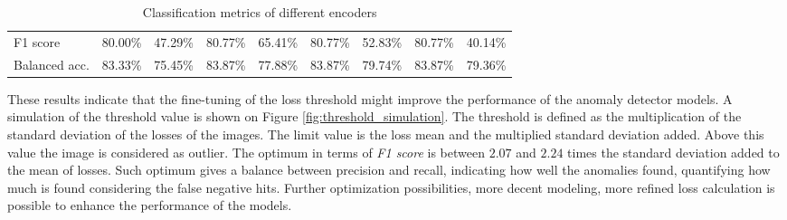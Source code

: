 \begin{table}[H]
\begin{tabular}{l | c c | c c | c c | c c}
        \hline
        F1 score        & 80.00\%                    & 47.29\%                       & 80.77\%                       & 65.41\%                             & 80.77\%  & 52.83\% & 80.77\%  & 40.14\% \\
        Balanced acc.   & 83.33\%                    & 75.45\%                       & 83.87\%                       & 77.88\%                             & 83.87\%  & 79.74\% & 83.87\%  & 79.36\% \\
    \end{tabular}
    \caption{Classification metrics of different encoders}
    \label{table:classification_metrics}
\end{table}

These results indicate that the fine-tuning of the loss threshold might improve the performance
of the anomaly detector models.
A simulation of the threshold value is shown on Figure \ref{fig:threshold_simulation}.
The threshold is defined as the multiplication of the standard deviation of the losses of the images.
The limit value is the loss mean and the multiplied standard deviation added.
Above this value the image is considered as outlier.
The optimum in terms of \emph{F1 score} is between $2.07$ and $2.24$ times the standard deviation added
to the mean of losses.
Such optimum gives a balance between precision and recall, indicating how well the anomalies found,
quantifying how much is found considering the false negative hits.
Further optimization possibilities, more decent modeling, more refined loss calculation is possible
to enhance the performance of the models.

